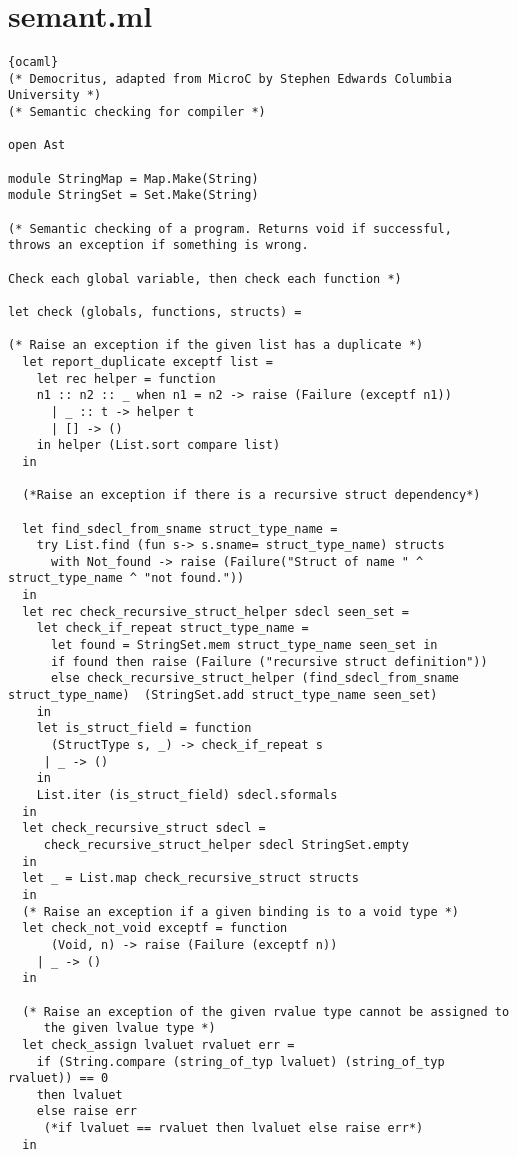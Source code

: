 \section{semant.ml}
\begin{lstlisting}{ocaml}
(* Democritus, adapted from MicroC by Stephen Edwards Columbia University *)
(* Semantic checking for compiler *)

open Ast

module StringMap = Map.Make(String)
module StringSet = Set.Make(String)

(* Semantic checking of a program. Returns void if successful,
throws an exception if something is wrong.

Check each global variable, then check each function *)

let check (globals, functions, structs) =

(* Raise an exception if the given list has a duplicate *)
  let report_duplicate exceptf list =
    let rec helper = function
	n1 :: n2 :: _ when n1 = n2 -> raise (Failure (exceptf n1))
      | _ :: t -> helper t
      | [] -> ()
    in helper (List.sort compare list)
  in

  (*Raise an exception if there is a recursive struct dependency*)
  
  let find_sdecl_from_sname struct_type_name =
    try List.find (fun s-> s.sname= struct_type_name) structs 
      with Not_found -> raise (Failure("Struct of name " ^ struct_type_name ^ "not found.")) 
  in
  let rec check_recursive_struct_helper sdecl seen_set =
    let check_if_repeat struct_type_name =
      let found = StringSet.mem struct_type_name seen_set in
      if found then raise (Failure ("recursive struct definition"))
      else check_recursive_struct_helper (find_sdecl_from_sname struct_type_name)  (StringSet.add struct_type_name seen_set)
    in
    let is_struct_field = function
      (StructType s, _) -> check_if_repeat s
     | _ -> () 
    in
    List.iter (is_struct_field) sdecl.sformals
  in
  let check_recursive_struct sdecl =
     check_recursive_struct_helper sdecl StringSet.empty    
  in
  let _ = List.map check_recursive_struct structs
  in
  (* Raise an exception if a given binding is to a void type *)
  let check_not_void exceptf = function
      (Void, n) -> raise (Failure (exceptf n))
    | _ -> ()
  in
  
  (* Raise an exception of the given rvalue type cannot be assigned to
     the given lvalue type *)
  let check_assign lvaluet rvaluet err =
	if (String.compare (string_of_typ lvaluet) (string_of_typ rvaluet)) == 0
	then lvaluet
	else raise err
     (*if lvaluet == rvaluet then lvaluet else raise err*)
  in


\end{lstlisting}

